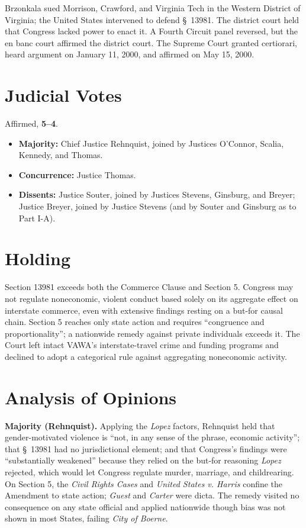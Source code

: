 \documentclass[12pt]{article}
\begin{document}
Brzonkala sued Morrison, Crawford, and Virginia Tech in the Western District of Virginia; the United States intervened to defend \S~13981. The district court held that Congress lacked power to enact it. A Fourth Circuit panel reversed, but the en banc court affirmed the district court. The Supreme Court granted certiorari, heard argument on January 11, 2000, and affirmed on May 15, 2000.

\section{Judicial Votes}

Affirmed, \textbf{5--4}.
\begin{itemize}
\item \textbf{Majority:} Chief Justice Rehnquist, joined by Justices O'Connor, Scalia, Kennedy, and Thomas.
\item \textbf{Concurrence:} Justice Thomas.
\item \textbf{Dissents:} Justice Souter, joined by Justices Stevens, Ginsburg, and Breyer; Justice Breyer, joined by Justice Stevens (and by Souter and Ginsburg as to Part I-A).
\end{itemize}

\section{Holding}

Section 13981 exceeds both the Commerce Clause and Section 5. Congress may not regulate noneconomic, violent conduct based solely on its aggregate effect on interstate commerce, even with extensive findings resting on a but-for causal chain. Section 5 reaches only state action and requires ``congruence and proportionality''; a nationwide remedy against private individuals exceeds it. The Court left intact VAWA's interstate-travel crime and funding programs and declined to adopt a categorical rule against aggregating noneconomic activity.

\section{Analysis of Opinions}

\textbf{Majority (Rehnquist).} Applying the \textit{Lopez} factors, Rehnquist held that gender-motivated violence is ``not, in any sense of the phrase, economic activity''; that \S~13981 had no jurisdictional element; and that Congress's findings were ``substantially weakened'' because they relied on the but-for reasoning \textit{Lopez} rejected, which would let Congress regulate murder, marriage, and childrearing. On Section 5, the \textit{Civil Rights Cases} and \textit{United States v. Harris} confine the Amendment to state action; \textit{Guest} and \textit{Carter} were dicta. The remedy visited no consequence on any state official and applied nationwide though bias was not shown in most States, failing \textit{City of Boerne}.
\end{document}
